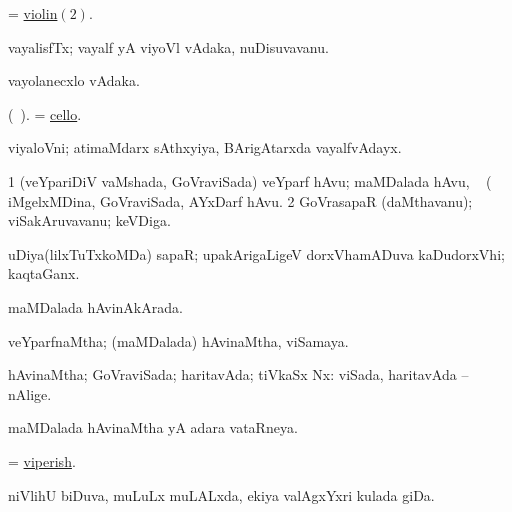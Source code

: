 \bentry
{} 
\gl{\nA}
\expl{}
\bmng
 = \hyperlink{violin(2)}{violin\((2)\)}. 
\emng
\eentry

\bentry 
{} 
\gl{\nA}
\expl{}
\bmng
 vayalisfTx; vayalf  yA viyoVl vAdaka, nuDisuvavanu. 
\emng
\eentry

\bentry
{} 
\gl{\nA}
\expl{}
\bmng
 vayolanecxlo vAdaka. 
\emng
\eentry

\bentry
{} 
\gl{\nA}(\bava\ ). 
\bmng
 = \hyperref{kandict_c.pdf}{C}{cello}{cello}. 
\emng
\eentry

\bentry
{} 
\gl{\nA}
\expl{}
\bmng
 viyaloVni; atimaMdarx sAthxyiya, BArigAtarxda vayalfvAdayx. 
\emng
\eentry

\bentry
{}
\gl{\saMkiSx}
\expl{}
\bmng
\emng
\eentry

\bentry
{} 
\gl{\nA}
\expl{}
\bmng
\bnum
\num{1} (veYpariDiV vaMshada, GoVraviSada) veYparf hAvu; maMDalada hAvu, \kanmu\  (  iMgelxMDina, GoVraviSada, AYxDarf hAvu. 
\num{2} GoVrasapaR (daMthavanu); viSakAruvavanu; keVDiga. 
\enum
\emng

\noindent 
\gl{\pagu}
\expl{}
\bmng
  uDiya(lilxTuTxkoMDa) sapaR; upakArigaLigeV dorxVhamADuva kaDudorxVhi; kaqtaGanx. 
\emng
\eentry

\bentry
{} 
\gl{\gu}
\expl{}
\bmng
 maMDalada hAvinAkArada. 
\emng
\eentry

\bentry
{} 
\gl{\gu}
\expl{}
\bmng
 veYparfnaMtha; (maMDalada) hAvinaMtha, viSamaya. 
\emng
\eentry

\bentry
{} 
\gl{\gu}
\expl{}
\bmng
 hAvinaMtha; GoVraviSada; haritavAda; tiVkaSx Nx:  viSada, haritavAda -- nAlige. 
\emng
\eentry

\bentry
{} 
\gl{\gu}
\expl{}
\bmng
 maMDalada hAvinaMtha yA adara vataRneya. 
\emng
\eentry

\bentry
{} 
\gl{\gu}
\expl{}
\bmng
 = \hyperlink{viperish}{viperish}. 
\emng
\eentry

\bentry
{} 
\gl{\nA}
\expl{}
\bmng
 niVlihU biDuva, muLuLx muLALxda, ekiya valAgxYxri kulada giDa. 
\emng
\eentry

